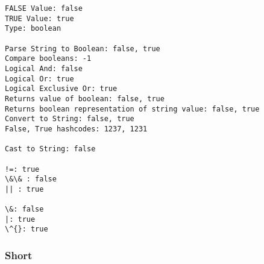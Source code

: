 \documentclass[9pt]{article}
\begin{document}
    \begin{Verbatim}[commandchars=\\\{\}]
FALSE Value: false
TRUE Value: true
Type: boolean

Parse String to Boolean: false, true
Compare booleans: -1
Logical And: false
Logical Or: true
Logical Exclusive Or: true
Returns value of boolean: false, true
Returns boolean representation of string value: false, true
Convert to String: false, true
False, True hashcodes: 1237, 1231

Cast to String: false

!=: true
\&\& : false
|| : true

\&: false
|: true
\^{}: true

    \end{Verbatim}

    \hypertarget{short}{%
\subsubsection{Short}\label{short}}
\end{document}
